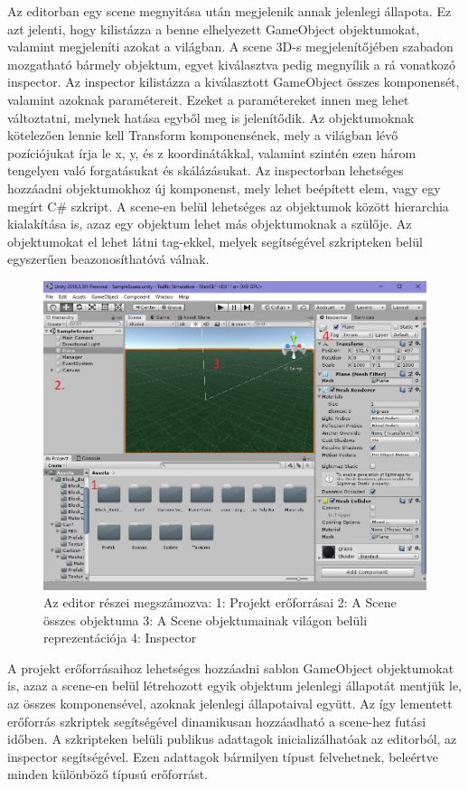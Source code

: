 Az editorban egy scene megnyitása után megjelenik annak jelenlegi állapota. Ez azt jelenti, hogy kilistázza a benne elhelyezett GameObject objektumokat, valamint megjeleníti azokat a világban. A scene 3D-s megjelenítőjében szabadon mozgatható bármely objektum, egyet kiválasztva pedig megnyílik a rá vonatkozó inspector. Az inspector kilistázza a kiválasztott GameObject összes komponensét, valamint azoknak paramétereit. Ezeket a paramétereket innen meg lehet változtatni, melynek hatása egyből meg is jelenítődik. Az objektumoknak kötelezően lennie kell Transform komponensének, mely a világban lévő pozíciójukat írja le x, y, és z koordinátákkal, valamint szintén ezen három tengelyen való forgatásukat és skálázásukat.
Az inspectorban lehetséges hozzáadni objektumokhoz új komponenst, mely lehet beépített elem, vagy egy megírt C\# szkript. A scene-en belül lehetséges az objektumok között hierarchia kialakítása is, azaz egy objektum lehet más objektumoknak a szülője.
Az objektumokat el lehet látni tag-ekkel, melyek segítségével szkripteken belül egyszerűen beazonosíthatóvá válnak.
\begin{figure}[H]
\includegraphics[width=\linewidth]{editor.png}
\caption{Az editor részei megszámozva: 1: Projekt erőforrásai 2: A Scene összes objektuma 3: A Scene objektumainak világon belüli reprezentációja 4: Inspector}
\label{fig:ed}
\end{figure}
A projekt erőforrásaihoz lehetséges hozzáadni sablon GameObject objektumokat is, azaz a scene-en belül létrehozott egyik objektum jelenlegi állapotát mentjük le, az összes komponensével, azoknak jelenlegi állapotaival együtt. Az így lementett erőforrás szkriptek segítségével dinamikusan hozzáadható a scene-hez futási időben. A szkripteken belüli publikus adattagok inicializálhatóak az editorból, az inspector segítségével. Ezen adattagok bármilyen típust felvehetnek, beleértve minden különböző típusú erőforrást.
